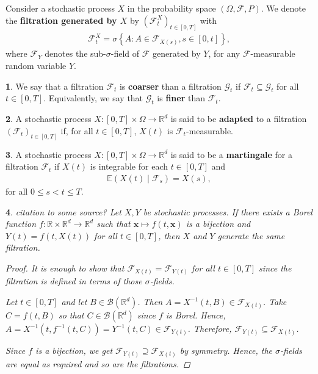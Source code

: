 \documentclass[english]{article}
\newcommand{\comment}[1]{\color{blue}#1\color{black}}
\numberwithin{equation}{section}
\numberwithin{figure}{section}
\theoremstyle{bolddescit}
\newtheorem{theorem}{\protect\theoremname}[section]
\theoremstyle{definition}
\newtheorem{definition}[theorem]{\protect\definitionname}
\theoremstyle{definition}
\theoremstyle{plain}
\theoremstyle{plain}
\theoremstyle{bolddesc}
\theoremstyle{plain}
\theoremstyle{remark}
\providecommand{\definitionname}{Definition}
\providecommand{\theoremname}{Theorem}
\begin{document}
Consider a stochastic process $X$ in the probability space $(\Omega, \mathcal{F}, P)$. We denote the \textbf{filtration generated by $X$} by $(\mathcal{F}^X_t)_{t \in [0,T]}$ with
\begin{align*}
  \mathcal{F}^X_t = \sigma \left\{ A : A \in \mathcal{F}_{X(s)}, s \in [0,t] \right\},
\end{align*}
where $\mathcal{F}_{Y}$ denotes the sub-$\sigma$-field of $\mathcal{F}$ generated by $Y$, for any $\mathcal{F}$-measurable random variable $Y$.

\begin{definition}
  We say that a filtration $\mathcal{F}_t$ is \textbf{coarser} than a filtration $\mathcal{G}_t$ if $\mathcal{F}_t \subseteq \mathcal{G}_t$ for all $t \in [0,T]$. Equivalently, we say that $\mathcal{G}_t$ is \textbf{finer} than $\mathcal{F}_t$.
\end{definition}

\begin{definition}
  A stochastic process $X : [0,T] \times \Omega \to \mathbb{R}^d$ is said to be \textbf{adapted} to a filtration $(\mathcal{F}_t)_{t \in [0,T]}$ if, for all $t \in [0,T]$, $X(t)$ is $\mathcal{F}_t$-measurable.
\end{definition}

\begin{definition}
  A stochastic process $X : [0,T] \times \Omega \to \mathbb{R}^d$ is said to be a \textbf{martingale} for a filtration $\mathcal{F}_t$ if $X(t)$ is integrable for each $t \in [0,T]$ and
  \begin{align*}
    \mathbb{E}(X(t) \mid \mathcal{F}_s) = X(s),
  \end{align*}
  for all $0 \le s < t \le T$.
\end{definition}

\begin{theorem}\label{thm:bijection-filtration}
\comment{citation to some source?}
  Let $X, Y$ be stochastic processes. If there exists a Borel function $f : \mathbb{R} \times \mathbb{R}^d \to \mathbb{R}^d$ such that $\mathbf{x} \mapsto f(t,\mathbf{x})$ is a bijection and $Y(t) = f(t, X(t))$ for all $t \in [0,T]$, then $X$ and $Y$ generate the same filtration.

  \begin{proof}
    It is enough to show that $\mathcal{F}_{X(t)} = \mathcal{F}_{Y(t)}$ for all $t \in [0,T]$ since the filtration is defined in terms of those $\sigma$-fields.

    Let $t \in [0,T]$ and let $B \in \mathcal{B}(\mathbb{R}^d)$. Then $A = X^{-1}(t,B) \in \mathcal{F}_{X(t)}$. Take $C = f(t, B)$ so that $C \in \mathcal{B}(\mathbb{R}^d)$ since $f$ is Borel. Hence, $A = X^{-1}(t,f^{-1}(t,C)) = Y^{-1}(t,C) \in \mathcal{F}_{Y(t)}$. Therefore, $\mathcal{F}_{Y(t)} \subseteq \mathcal{F}_{X(t)}$.

    Since $f$ is a bijection, we get $\mathcal{F}_{Y(t)} \supseteq \mathcal{F}_{X(t)}$ by symmetry. Hence, the $\sigma$-fields are equal as required and so are the filtrations.
  \end{proof}
\end{theorem}
\end{document}
